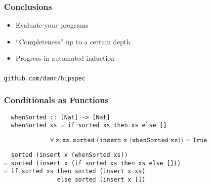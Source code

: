 \documentclass[serif,professionalfont]{beamer}
\newcommand\faa[2]{ \forall \, #1 , #2 . \,}
\newcommand\hs[1]{\texttt{#1}}
\newcommand\xs[0]{\hs{xs}}
\begin{document}

\begin{frame}
  \frametitle{Conclusions}
  \begin{itemize}
    \item Evaluate your programs
    \pause
    \item ``Completeness'' up to a certain depth
    \pause
    \item Progress in automated induction
  \end{itemize}
\end{frame}

\begin{frame}
\frametitle{}
\begin{center}
\hs{github.com/danr/hipspec}
\end{center}
\end{frame}

\begin{frame}[fragile]
  \frametitle{Conditionals as Functions}

  \insertlemma

\begin{verbatim}
  whenSorted :: [Nat] -> [Nat]
  whenSorted xs = if sorted xs then xs else []
\end{verbatim}

  \begin{equation*}
    \faa{\hs{x}}{\xs} \hs{sorted (insert x (whenSorted xs))} = \hs{True}
  \end{equation*}

\pause

\begin{verbatim}
  sorted (insert x (whenSorted xs))
= sorted (insert x (if sorted xs then xs else []))
= if sorted xs then sorted (insert x xs)
               else sorted (insert x [])
\end{verbatim}

\end{frame}
\end{document}
